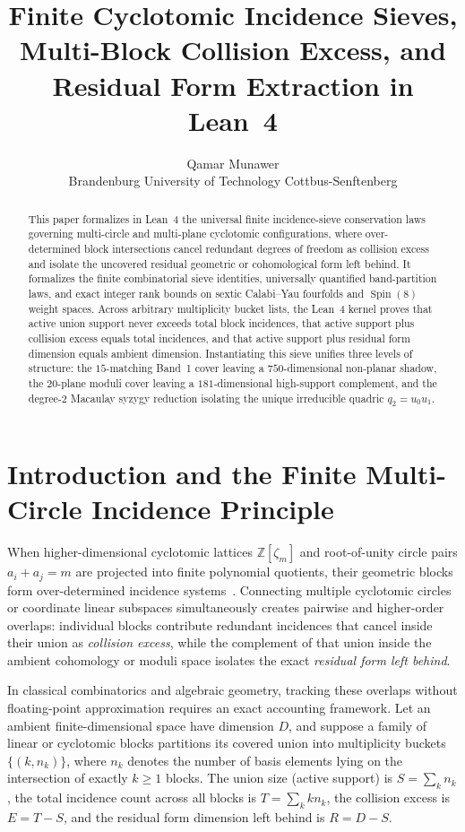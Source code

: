 \documentclass[11pt,a4paper]{article}
\title{\textbf{Finite Cyclotomic Incidence Sieves, Multi-Block Collision Excess, and Residual Form Extraction in Lean~4}}
\author{Qamar Munawer \\ Brandenburg University of Technology Cottbus-Senftenberg}
\date{}
\begin{document}
\maketitle

\begin{abstract}
This paper formalizes in Lean~4 the universal finite incidence-sieve conservation laws governing multi-circle and multi-plane cyclotomic configurations, where over-determined block intersections cancel redundant degrees of freedom as collision excess and isolate the uncovered residual geometric or cohomological form left behind. It formalizes the finite combinatorial sieve identities, universally quantified band-partition laws, and exact integer rank bounds on sextic Calabi--Yau fourfolds and $\operatorname{Spin}(8)$ weight spaces. Across arbitrary multiplicity bucket lists, the Lean~4 kernel proves that active union support never exceeds total block incidences, that active support plus collision excess equals total incidences, and that active support plus residual form dimension equals ambient dimension. Instantiating this sieve unifies three levels of structure: the $15$-matching Band~1 cover leaving a $750$-dimensional non-planar shadow, the $20$-plane moduli cover leaving a $181$-dimensional high-support complement, and the degree-$2$ Macaulay syzygy reduction isolating the unique irreducible quadric $q_2 = u_0 u_1$.
\end{abstract}

\section{Introduction and the Finite Multi-Circle Incidence Principle}

When higher-dimensional cyclotomic lattices $\mathbb{Z}[\zeta_m]$ and root-of-unity circle pairs $a_i + a_j = m$ are projected into finite polynomial quotients, their geometric blocks form over-determined incidence systems~\cite{Shioda1979,Aoki1983}. Connecting multiple cyclotomic circles or coordinate linear subspaces simultaneously creates pairwise and higher-order overlaps: individual blocks contribute redundant incidences that cancel inside their union as \emph{collision excess}, while the complement of that union inside the ambient cohomology or moduli space isolates the exact \emph{residual form left behind}.

In classical combinatorics and algebraic geometry, tracking these overlaps without floating-point approximation requires an exact accounting framework. Let an ambient finite-dimensional space have dimension $D$, and suppose a family of linear or cyclotomic blocks partitions its covered union into multiplicity buckets $\{(k, n_k)\}$, where $n_k$ denotes the number of basis elements lying on the intersection of exactly $k \ge 1$ blocks. The union size (active support) is $S = \sum_k n_k$, the total incidence count across all blocks is $T = \sum_k k n_k$, the collision excess is $E = T - S$, and the residual form dimension left behind is $R = D - S$.
\end{document}

